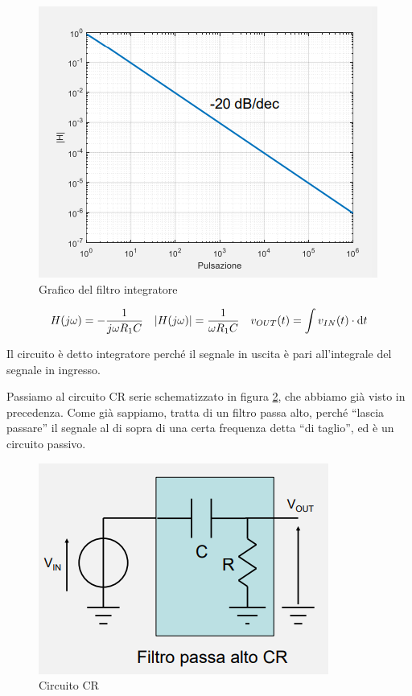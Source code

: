 \documentclass{article}
\begin{document}
\begin{figure}[h]
  \centering
  \includegraphics[scale=0.6]{IM_filtro_integratore_grafici}
  \caption{Grafico del filtro integratore}
  \label{Schema_filtro_integratore_grafici}
\end{figure}

\[H(j \omega) = - \frac{1}{j \omega R_1 C} \quad |H(j \omega)| = \frac{1}{\omega R_1 C} \quad v_{OUT} (t) = \int v_{IN} (t) \cdot \textrm d t\]

Il circuito è detto integratore perché il segnale in uscita è pari all'integrale del segnale in ingresso.

\clearpage
Passiamo al circuito CR serie schematizzato in figura \ref{Schema_circuito_CR_passivo_bis}, che abbiamo già visto in precedenza. Come già sappiamo, tratta di un filtro passa alto, perché ``lascia passare'' il segnale al di sopra di una certa frequenza detta ``di taglio'', ed è un circuito passivo.

\begin{figure}[h]
  \centering
  \includegraphics[scale=0.6]{IM_circuito_CR_passivo}
  \caption{Circuito CR}
  \label{Schema_circuito_CR_passivo_bis}
\end{figure}
\end{document}
